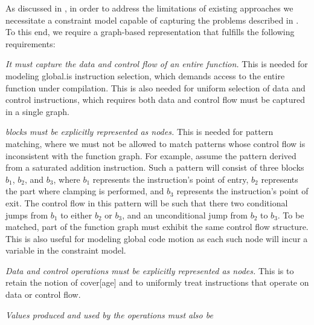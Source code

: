 As discussed in , in order to
address the limitations of existing approaches we necessitate a \gls{constraint
  model} capable of capturing the problems described in
.
%
To this end, we require a \gls{graph}-based representation that fulfills the
following requirements:
%
\def\typesetReq#1{\emph{#1}}%
\begin{requirements}
  \item {}
    \typesetReq{It must capture the data and control flow of an entire
      \gls{function}.}
    This is needed for modeling \gls{global.is} \gls{instruction selection},
    which demands access to the entire \gls{function} under compilation.
    This is also needed for uniform selection of data and control
    \glspl{instruction}, which requires both data and control flow must be
    captured in a single \gls{graph}.
  \item {}
    \typesetReq{\Glspl{block} must be explicitly represented as \glspl{node}.}
    This is needed for \gls{pattern matching}, where we must not be allowed to
    match \glspl{pattern} whose control flow is inconsistent with the
    \gls{function graph}.
    For example, assume the \gls{pattern} derived from a saturated addition
    \gls{instruction}.
    Such a \gls{pattern} will consist of three \glspl{block}~$b_1$, $b_2$, and
    $b_3$, where $b_1$ represents the \gls{instruction}'s point of entry, $b_2$
    represents the part where clamping is performed, and $b_3$ represents the
    \gls{instruction}'s point of exit.
    The control flow in this \gls{pattern} will be such that there two
    conditional jumps from $b_1$ to either $b_2$ or $b_3$, and an unconditional
    jump from $b_2$ to $b_3$.
    To be matched, part of the \gls{function graph} must exhibit the same
    control flow structure.
    This is also useful for modeling \gls{global code motion} as each such
    \gls{node} will incur a \gls{variable} in the \gls{constraint model}.
  \item {}
    \typesetReq{Data and control \glspl{operation} must be explicitly
      represented as \glspl{node}.}
    This is to retain the notion of \gls{cover}[age] and to uniformly treat
    \glspl{instruction} that operate on data or control flow.
  \item {}
    \typesetReq{Values produced and used by the \glspl{operation} must also be
}
\end{requirements}
